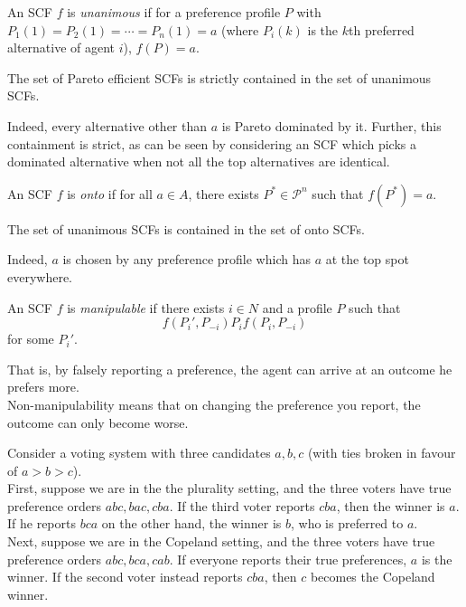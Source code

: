	\begin{fdef}[Unanimity]
		An SCF $f$ is \emph{unanimous} if for a preference profile $P$ with $P_1(1) = P_2(1) = \cdots = P_n(1) = a$ (where $P_i(k)$ is the $k$th preferred alternative of agent $i$), $f(P) = a$.
	\end{fdef}

	\begin{prop}
		The set of Pareto efficient SCFs is strictly contained in the set of unanimous SCFs.
	\end{prop}
	Indeed, every alternative other than $a$ is Pareto dominated by it. Further, this containment is strict, as can be seen by considering an SCF which picks a dominated alternative when not all the top alternatives are identical.

	\begin{fdef}[Ontoness]
		An SCF $f$ is \emph{onto} if for all $a \in A$, there exists $P^* \in \mathcal{P}^n$ such that $f(P^*) = a$.
	\end{fdef}

	\begin{prop}
		The set of unanimous SCFs is contained in the set of onto SCFs.
	\end{prop}
	Indeed, $a$ is chosen by any preference profile which has $a$ at the top spot everywhere.

	\begin{fdef}[Manipulability]
		An SCF $f$ is \emph{manipulable} if there exists $i \in N$ and a profile $P$ such that
		\[ f(P_i',P_{-i}) P_i f(P_i,P_{-i}) \]
		for some $P_i'$.
	\end{fdef}
	That is, by falsely reporting a preference, the agent can arrive at an outcome he prefers more.\\
	Non-manipulability means that on changing the preference you report, the outcome can only become worse.

	\begin{fex}[Manipulability]
		Consider a voting system with three candidates $a,b,c$ (with ties broken in favour of $a > b > c$). \\
		First, suppose we are in the the plurality setting, and the three voters have true preference orders $abc, bac, cba$. If the third voter reports $cba$, then the winner is $a$. If he reports $bca$ on the other hand, the winner is $b$, who is preferred to $a$.\\
		Next, suppose we are in the Copeland setting, and the three voters have true preference orders $abc,bca,cab$. If everyone reports their true preferences, $a$ is the winner. If the second voter instead reports $cba$, then $c$ becomes the Copeland winner. 
	\end{fex}

